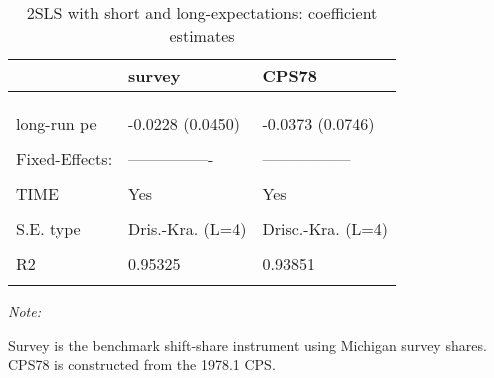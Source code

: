 \begin{table}

\caption{\label{tab:2sls:shortandlong:stage2}2SLS with short and long-expectations: coefficient estimates}
\centering
\begin{threeparttable}
\begin{tabular}[t]{lll}
\toprule
  & survey & CPS78\\
\midrule
\cellcolor{gray!6}{Dependent Var.:} & \cellcolor{gray!6}{RegInf} & \cellcolor{gray!6}{RegInf}\\
\addlinespace
 &  & \\
\addlinespace
\cellcolor{gray!6}{short-run pe} & \cellcolor{gray!6}{0.3355* (0.1475)} & \cellcolor{gray!6}{0.5394** (0.1931)}\\
\addlinespace
long-run pe & -0.0228 (0.0450) & -0.0373 (0.0746)\\
\addlinespace
\cellcolor{gray!6}{Controls} & \cellcolor{gray!6}{Yes} & \cellcolor{gray!6}{Yes}\\
\addlinespace
Fixed-Effects: & ---------------- & -----------------\\
\addlinespace
\cellcolor{gray!6}{REGION} & \cellcolor{gray!6}{Yes} & \cellcolor{gray!6}{Yes}\\
\addlinespace
TIME & Yes & Yes\\
\addlinespace
\cellcolor{gray!6}{\_\_\_\_\_\_\_\_\_\_\_\_\_\_\_} & \cellcolor{gray!6}{\_\_\_\_\_\_\_\_\_\_\_\_\_\_\_\_} & \cellcolor{gray!6}{\_\_\_\_\_\_\_\_\_\_\_\_\_\_\_\_\_}\\
\addlinespace
S.E. type & Dris.-Kra. (L=4) & Drisc.-Kra. (L=4)\\
\addlinespace
\cellcolor{gray!6}{Observations} & \cellcolor{gray!6}{1,387} & \cellcolor{gray!6}{1,387}\\
\addlinespace
R2 & 0.95325 & 0.93851\\
\addlinespace
\cellcolor{gray!6}{Within R2} & \cellcolor{gray!6}{0.54716} & \cellcolor{gray!6}{0.40438}\\
\bottomrule
\end{tabular}
\begin{tablenotes}
\item \textit{Note: } 
\item Survey is the benchmark shift-share instrument using Michigan survey shares. CPS78 is constructed from the 1978.1 CPS.
\end{tablenotes}
\end{threeparttable}
\end{table}
